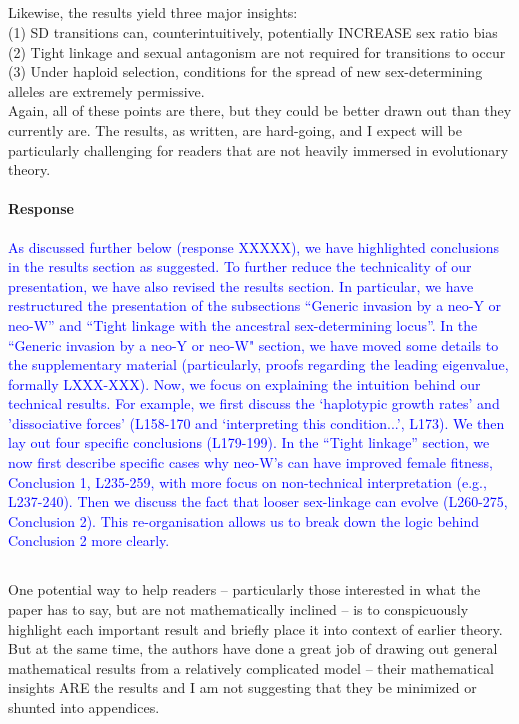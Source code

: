 \documentclass[10pt,letterpaper]{article}
\begin{document}
\noindent\subsection{}
Likewise, the results yield three major insights:\\
(1) SD transitions can, counterintuitively, potentially INCREASE sex ratio bias\\
(2) Tight linkage and sexual antagonism are not required for transitions to occur\\
(3) Under haploid selection, conditions for the spread of new sex-determining alleles are extremely permissive.\\
Again, all of these points are there, but they could be better drawn out than they currently are. The results, as written, are hard-going, and I expect will be particularly challenging for readers that are not heavily immersed in evolutionary theory.

\noindent\paragraph{Response}
\textcolor{blue}{
As discussed further below (response XXXXX), we have highlighted conclusions in the results section as suggested. 
To further reduce the technicality of our presentation, we have also revised the results section. 
In particular, we have restructured the presentation of the subsections ``Generic invasion by a neo-Y or neo-W'' and ``Tight linkage with the ancestral sex-determining locus''. 
In the ``Generic invasion by a neo-Y or neo-W" section, we have moved some details to the supplementary material (particularly, proofs regarding the leading eigenvalue, formally LXXX-XXX). 
Now, we focus on explaining the intuition behind our technical results.  
For example, we first discuss the `haplotypic growth rates' and 'dissociative forces' (L158-170 and `interpreting this condition...', L173).
We then lay out four specific conclusions (L179-199). 
In the ``Tight linkage'' section, we now first describe specific cases why neo-W's can have improved female fitness, Conclusion 1, L235-259, with more focus on non-technical interpretation (e.g., L237-240). 
Then we discuss the fact that looser sex-linkage can evolve (L260-275, Conclusion 2). 
This re-organisation allows us to break down the logic behind Conclusion 2 more clearly. 
}

\noindent\subsection{}
One potential way to help readers -- particularly those interested in what the paper has to say, but are not mathematically inclined -- is to conspicuously highlight each important result and briefly place it into context of earlier theory. But at the same time, the authors have done a great job of drawing out general mathematical results from a relatively complicated model -- their mathematical insights ARE the results and I am not suggesting that they be minimized or shunted into appendices.
\end{document}
